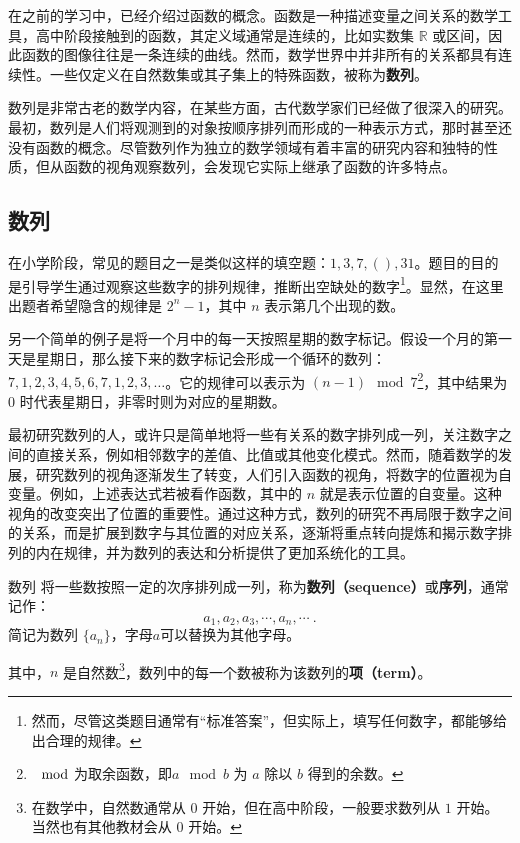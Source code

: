 
\begin{issues}
\issueDraft
\end{issues}

在之前的学习中，已经介绍过函数的概念。函数是一种描述变量之间关系的数学工具，高中阶段接触到的函数，其定义域通常是连续的，比如实数集 $\mathbb{R}$ 或区间，因此函数的图像往往是一条连续的曲线。然而，数学世界中并非所有的关系都具有连续性。一些仅定义在自然数集或其子集上的特殊函数，被称为\textbf{数列}。

数列是非常古老的数学内容，在某些方面，古代数学家们已经做了很深入的研究。最初，数列是人们将观测到的对象按顺序排列而形成的一种表示方式，那时甚至还没有函数的概念。尽管数列作为独立的数学领域有着丰富的研究内容和独特的性质，但从函数的视角观察数列，会发现它实际上继承了函数的许多特点。

\subsection{数列}

在小学阶段，常见的题目之一是类似这样的填空题：$1,3,7,(),31$。题目的目的是引导学生通过观察这些数字的排列规律，推断出空缺处的数字\footnote{然而，尽管这类题目通常有“标准答案”，但实际上，填写任何数字，都能够给出合理的规律。}。显然，在这里出题者希望隐含的规律是 $2^n - 1$，其中 $n$ 表示第几个出现的数。

另一个简单的例子是将一个月中的每一天按照星期的数字标记。假设一个月的第一天是星期日，那么接下来的数字标记会形成一个循环的数列：$7, 1, 2, 3, 4, 5, 6, 7, 1, 2, 3, \dots$。它的规律可以表示为 $(n-1) \mod 7$\footnote{$\mod$为取余函数，即$a \mod b$ 为 $a$ 除以 $b$ 得到的余数。}，其中结果为 $0$ 时代表星期日，非零时则为对应的星期数。

最初研究数列的人，或许只是简单地将一些有关系的数字排列成一列，关注数字之间的直接关系，例如相邻数字的差值、比值或其他变化模式。然而，随着数学的发展，研究数列的视角逐渐发生了转变，人们引入函数的视角，将数字的位置视为自变量。例如，上述表达式若被看作函数，其中的 $n$ 就是表示位置的自变量。这种视角的改变突出了位置的重要性。通过这种方式，数列的研究不再局限于数字之间的关系，而是扩展到数字与其位置的对应关系，逐渐将重点转向提炼和揭示数字排列的内在规律，并为数列的表达和分析提供了更加系统化的工具。

\begin{definition}{数列}
将一些数按照一定的次序排列成一列，称为\textbf{数列（sequence）}或\textbf{序列}，通常记作：
\begin{equation}
a_1, a_2, a_3, \cdots, a_n, \cdots~.
\end{equation}
简记为数列 $\{a_n\}$，字母$a$可以替换为其他字母。

其中，$n$ 是自然数\footnote{在数学中，自然数通常从 $0$ 开始，但在高中阶段，一般要求数列从 $1$ 开始。当然也有其他教材会从 $0$ 开始。}，数列中的每一个数被称为该数列的\textbf{项（term）}。
\end{definition}


